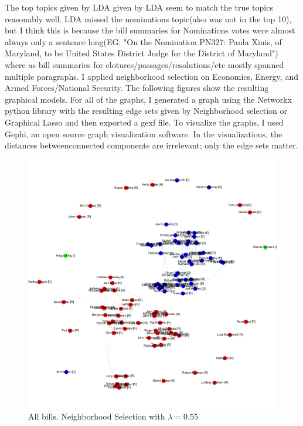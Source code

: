 \documentclass{article}
\begin{document}
The top topics given by LDA given by LDA seem to match the true topics reasonably well. LDA missed the nominations topic(also was not in the top 10), but I think this is because the bill summaries for Nominations votes were almost always only a sentence long(EG: "On the Nomination PN327: Paula Xinis, of Maryland, to be United States District Judge for the District of Maryland") where as bill summaries for clotures/passages/resolutions/etc mostly spanned multiple paragraphs. I applied neighborhood selection on Economics, Energy, and Armed Forces/National Security. The following figures show the resulting graphical models. For all of the graphs, I generated a graph using the Networkx python library with the resulting edge sets given by Neighborhood selection or Graphical Lasso and then exported a gexf file. To visualize the graphs, I used Gephi, an open source graph visualization software. In the visualizations, the distances betweenconnected components are irrelevant; only the edge sets matter.

\begin{figure} 
\caption{\label{fig: nbd55}All bills. Neighborhood Selection with $\lambda = 0.55$}
  \includegraphics[width=\textwidth]{nbd_55_all.png}
\end{figure}
\end{document}
